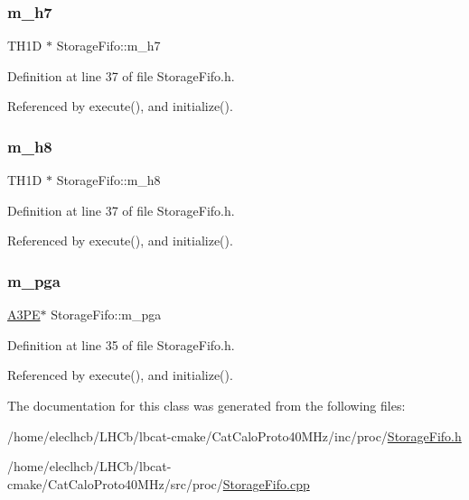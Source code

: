 \subsubsection{\texorpdfstring{m\+\_\+h7}{m\_h7}}
{\footnotesize\ttfamily T\+H1D $\ast$ Storage\+Fifo\+::m\+\_\+h7\hspace{0.3cm}{\ttfamily [private]}}



Definition at line 37 of file Storage\+Fifo.\+h.



Referenced by execute(), and initialize().

\mbox{\label{classStorageFifo_aeef4b7183e14d05bab673d948d85b84c}} 
\subsubsection{\texorpdfstring{m\+\_\+h8}{m\_h8}}
{\footnotesize\ttfamily T\+H1D $\ast$ Storage\+Fifo\+::m\+\_\+h8\hspace{0.3cm}{\ttfamily [private]}}



Definition at line 37 of file Storage\+Fifo.\+h.



Referenced by execute(), and initialize().

\mbox{\label{classStorageFifo_a9e4b9d56d0cc911f124a2848d6b43981}} 
\subsubsection{\texorpdfstring{m\+\_\+pga}{m\_pga}}
{\footnotesize\ttfamily \hyperlink{classA3PE}{A3\+PE}$\ast$ Storage\+Fifo\+::m\+\_\+pga\hspace{0.3cm}{\ttfamily [private]}}



Definition at line 35 of file Storage\+Fifo.\+h.



Referenced by execute(), and initialize().



The documentation for this class was generated from the following files\+:\begin{DoxyCompactItemize}
\item 
/home/eleclhcb/\+L\+H\+Cb/lbcat-\/cmake/\+Cat\+Calo\+Proto40\+M\+Hz/inc/proc/\hyperlink{StorageFifo_8h}{Storage\+Fifo.\+h}\item 
/home/eleclhcb/\+L\+H\+Cb/lbcat-\/cmake/\+Cat\+Calo\+Proto40\+M\+Hz/src/proc/\hyperlink{StorageFifo_8cpp}{Storage\+Fifo.\+cpp}\end{DoxyCompactItemize}
